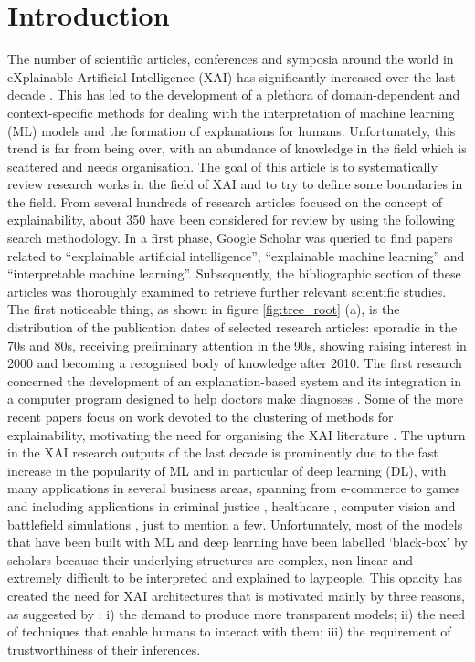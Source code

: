 \documentclass[final,1p,times]{elsarticle}
\begin{document}
\section{Introduction}
The number of scientific articles, conferences and symposia around the world in eXplainable Artificial Intelligence (XAI) has significantly increased over the last decade \cite{adadi2018peeking,preece2018asking}. This has led to the development of a plethora of domain-dependent and context-specific methods for dealing with the interpretation of machine learning (ML) models and the formation of explanations for humans. Unfortunately, this trend is far from being over, with an abundance of knowledge in the field which is scattered and needs organisation.
The goal of this article is to systematically review research works in the field of XAI and to try to define some boundaries in the field.
From several hundreds of research articles focused on the concept of explainability, about 350 have been considered for review by using the following search methodology. In a first phase, Google Scholar was queried to find papers related to ``explainable artificial intelligence'', ``explainable machine learning'' and ``interpretable machine learning''. Subsequently, the bibliographic section of these articles was thoroughly examined to retrieve further relevant scientific studies. The first noticeable thing, as shown in figure \ref{fig:tree_root} (a), is the distribution of the publication dates of selected research articles: sporadic in the 70s and 80s, receiving preliminary attention in the 90s, showing raising interest in 2000 and becoming a recognised body of knowledge after 2010. The first research concerned the development of an explanation-based system and its integration in a computer program designed to help doctors make diagnoses \cite{shortliffe1975computer}. Some of the more recent papers focus on work devoted to the clustering of methods for explainability, motivating the need for organising the XAI literature \cite{van2013research,dodge2018should,vellido2012making}. 
The upturn in the XAI research outputs of the last decade is prominently due to the fast increase in the popularity of ML and in particular of deep learning (DL), with many applications in several business areas, spanning from e-commerce \cite{wang2007recommendation} to games \cite{lapuschkin2019unmasking} and including applications in criminal justice \cite{rudin2014algorithms,rudin2019stop}, healthcare \cite{fellous2019explainable}, computer vision \cite{rudin2019stop} and battlefield simulations \cite{fox2017explainable}, just to mention a few. Unfortunately, most of the models that have been built with ML and deep learning have been labelled `black-box' by scholars because their underlying structures are complex, non-linear and extremely difficult to be interpreted and explained to laypeople. This opacity has created the need for XAI architectures that is motivated mainly by three reasons, as suggested by \cite{fox2017explainable,dovsilovic2018explainable}: i) the demand to produce more transparent models; ii) the need of techniques that enable humans to interact with them; iii) the requirement of trustworthiness of their inferences. 
\end{document}
